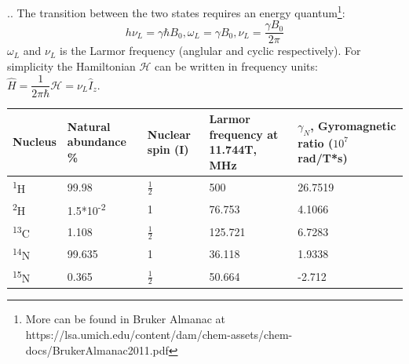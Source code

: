 \documentclass[handout]{beamer}
\begin{document}
\begin{frame}{\thesection.\thesubsection. \insertsubsection}
 The transition between the two states requires an energy quantum\footnote{More can be found in Bruker Almanac at https://lsa.umich.edu/content/dam/chem-assets/chem-docs/BrukerAlmanac2011.pdf}:
		\begin{equation}
			h \nu_L = \gamma \hbar B_0, \omega_L = \gamma B_0, \nu_L = \dfrac{\gamma B_0}{2 \pi}
		\end{equation}
		$\omega_L$ and $\nu_L$ is the Larmor frequency (anglular and cyclic respectively).
		For simplicity the Hamiltonian $\mathcal{H}$ can be written in frequency units: $\hat{H} = \dfrac{1}{2 \pi \hbar} \mathcal{H} = \nu_L \hat{I}_z $.

		
\begin{table}[ht]
	\centering
	\begin{tabular}{  C{1.0cm}  C{2.5cm}  C{1.0cm}  C{2.0cm}  C{2.0cm}}
		\hline\hline
		Nucleus & Natural abundance \% & Nuclear spin (I) & Larmor frequency at 11.744T, MHz & $\gamma_N$, Gyromagnetic ratio ($10^7$ rad/T*s) \\
		\hline
		\textsuperscript{1}H & 99.98 & $\frac{1}{2}$ & 500 & 26.7519 \\
		\textsuperscript{2}H & 1.5*10\textsuperscript{-2} & 1 & 76.753 & 4.1066 \\
		\textsuperscript{13}C & 1.108 & $\frac{1}{2}$ & 125.721 & 6.7283 \\
		\textsuperscript{14}N & 99.635 & 1 & 36.118 & 1.9338 \\
		\textsuperscript{15}N & 0.365 &  $\frac{1}{2}$ & 50.664 & -2.712 \\
		\hline
	\end{tabular}
\end{table}

\end{frame}
\end{document}
